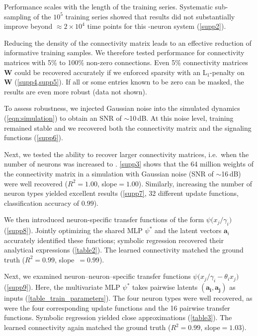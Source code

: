 \documentclass[10pt,twocolumn]{article}
\renewcommand\Vec[1]{\ensuremath{\boldsymbol{#1}}}
\newcommand\Mat[1]{\ensuremath{\boldsymbol{#1}}}
\begin{document}
Performance scales with the length of the training series.  Systematic sub-sampling of the $10^5$ training series showed that results did not substantially improve beyond $\approx 2\times10^4$ time points for this -neuron system (\cref{supp2}).

Reducing the density of the connectivity matrix leads to an effective reduction of informative training samples.  We therefore tested performance for connectivity matrices with 5\% to 100\% non-zero connections.  Even 5\% connectivity matrices $\Mat{W}$ could be recovered accurately if we enforced sparsity with an L$_1$-penalty on \(\Mat{W}\) (\cref{supp4,supp5}).  If all or some entries known to be zero can be masked, the results are even more robust (data not shown).

To assess robustness, we injected Gaussian noise into the simulated dynamics (\cref{eqn:simulation}) to obtain an SNR of $\sim$10\,dB. At this noise level, training remained stable and we recovered both the connectivity matrix and the signaling functions (\cref{supp6}).

Next, we tested the ability to recover larger connectivity matrices, i.e.\ when the number of neurons was increased to .  \cref{supp3} shows that the 64 million weights of the connectivity matrix in a simulation with Gaussian noise (SNR of $\sim$16\,dB) were well recovered ($R^2=1.00$, slope$=1.00$).  Similarly, increasing the number of neuron types yielded excellent results (\cref{supp7}, 32 different update functions, classification accuracy of $0.99$).

We then introduced neuron-specific transfer functions of the form $\psi\!\big(x_j/\gamma_i\big)$ (\cref{supp8}). Jointly optimizing the shared MLP $\psi^*$ and the latent vectors $\Vec{a}_i$ accurately identified these functions; symbolic regression recovered their analytical expressions (\cref{table2}). The learned connectivity matched the ground truth ($R^2=0.99$, slope~$=0.99$).

Next, we examined neuron–neuron–specific transfer functions $\psi\!\big(x_j/\gamma_i-\theta_i x_j\big)$ (\cref{supp9}).  Here, the multivariate MLP $\psi^*$ takes pairwise latents $(\Vec{a_i},\Vec{a_j})$ as inputs (\cref{table_train_parameters}).  The four neuron types were well recovered, as were the four corresponding update functions and the 16 pairwise transfer functions.  Symbolic regression yielded close approximations (\cref{table3}). The learned connectivity again matched the ground truth
($R^2=0.99$, slope$=1.03$).
\end{document}
